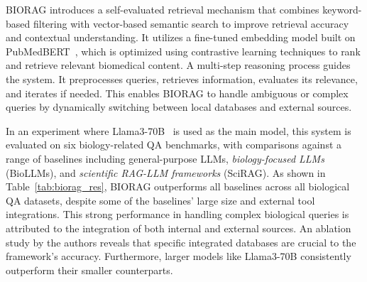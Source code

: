 \documentclass{DESSThesis}
\begin{document}
BIORAG introduces a self-evaluated retrieval mechanism that combines keyword-based filtering with vector-based semantic search to improve retrieval accuracy and contextual understanding. It utilizes a fine-tuned embedding model built on PubMedBERT~\cite{10.1145/3458754}, which is optimized using contrastive learning techniques to rank and retrieve relevant biomedical content. A multi-step reasoning process guides the system. It preprocesses queries, retrieves information, evaluates its relevance, and iterates if needed. This enables BIORAG to handle ambiguous or complex queries by dynamically switching between local databases and external sources.

In an experiment where Llama3-70B~\cite{metallama3} is used as the main model, this system is evaluated on six biology-related QA benchmarks, with comparisons against a range of baselines including general-purpose LLMs, \emph{biology-focused LLMs} (BioLLMs), and \emph{scientific RAG-LLM frameworks} (SciRAG). As shown in Table~\ref{tab:biorag_res}, BIORAG outperforms all baselines across all biological QA datasets, despite some of the baselines' large size and external tool integrations. This strong performance in handling complex biological queries is attributed to the integration of both internal and external sources. An ablation study by the authors reveals that specific integrated databases are crucial to the framework's accuracy. Furthermore, larger models like Llama3-70B consistently outperform their smaller counterparts.

\begin{table}[h]
\centering
{}
\caption[Performance of BioRAG compared to other RAG-LLMs on the biological-related QA benchmarks]{\textbf{Performance of BioRAG compared to other RAG-LLMs on the biological-related QA benchmarks}. Table taken from~\cite{wang2024bioragragllmframeworkbiological}. The scores represent accuracy. \textbf{Bold} and \underline{underlined} results denote the highest and second-highest performance, respectively.}
\label{tab:biorag_res}
\end{table}
\end{document}
